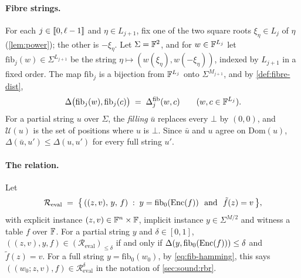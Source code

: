 \paragraph{Fibre strings.}
For each $j \in \llbracket 0, \ell-1 \rrbracket$ and $\eta \in L_{j+1}$, fix one of the two square roots $\xi_\eta \in L_j$ of $\eta$ (\cref{lem:power}); the other is $-\xi_\eta$.
Let $\Sigma = \mathbb{F}^2$, and for $w \in \mathbb{F}^{L_j}$ let $\mathrm{fib}_j(w) \in \Sigma^{L_{j+1}}$ be the string $\eta \mapsto (w(\xi_\eta), w(-\xi_\eta))$, indexed by $L_{j+1}$ in a fixed order.
The map $\mathrm{fib}_j$ is a bijection from $\mathbb{F}^{L_j}$ onto $\Sigma^{M_{j+1}}$, and by \cref{def:fibre-dist},
\begin{equation}\label{eq:fib-hamming}
  \Delta\bigl(\mathrm{fib}_j(w), \mathrm{fib}_j(c)\bigr) \;=\; \Delta^{\mathrm{fib}}_j(w, c) \qquad (w, c \in \mathbb{F}^{L_j}).
\end{equation}
For a partial string $u$ over $\Sigma$, the \emph{filling} $\bar u$ replaces every $\bot$ by $(0,0)$, and $\mathcal{U}(u)$ is the set of positions where $u$ is $\bot$.
Since $\bar u$ and $u$ agree on $\mathrm{Dom}(u)$, $\Delta(\bar u, u') \le \Delta(u, u')$ for every full string $u'$.

\paragraph{The relation.}
Let
\[
  \mathcal{R}_{\mathrm{eval}} \;=\; \bigl\{\, ((z,v),\, y,\, f) \;:\; y = \mathrm{fib}_0(\mathrm{Enc}(f)) \ \text{ and } \ \tilde f(z) = v \,\bigr\},
\]
with explicit instance $(z, v) \in \mathbb{F}^n \times \mathbb{F}$, implicit instance $y \in \Sigma^{M/2}$ and witness a table $f$ over $\mathbb{F}$.
For a partial string $y$ and $\delta \in [0,1]$, $((z,v), y, f) \in (\mathcal{R}_{\mathrm{eval}})_{\le\delta}$ if and only if $\Delta(y, \mathrm{fib}_0(\mathrm{Enc}(f))) \le \delta$ and $\tilde f(z) = v$.
For a full string $y = \mathrm{fib}_0(w_0)$, by \eqref{eq:fib-hamming}, this says $((w_0;z,v),f) \in \mathcal{R}^{\delta}_{\mathrm{eval}}$ in the notation of \cref{sec:sound:rbr}.


